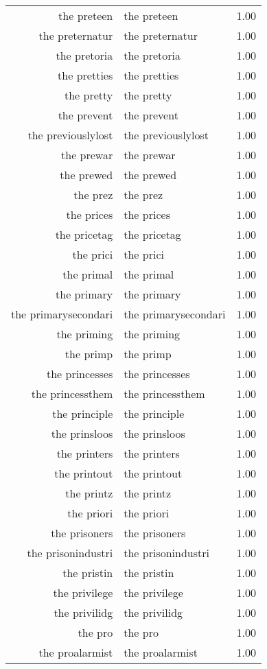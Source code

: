 \begin{table}[ht]
\begin{tabular}{rlr}
  the preteen & the preteen & 1.00 \\ 
  the preternatur & the preternatur & 1.00 \\ 
  the pretoria & the pretoria & 1.00 \\ 
  the pretties & the pretties & 1.00 \\ 
  the pretty & the pretty & 1.00 \\ 
  the prevent & the prevent & 1.00 \\ 
  the previouslylost & the previouslylost & 1.00 \\ 
  the prewar & the prewar & 1.00 \\ 
  the prewed & the prewed & 1.00 \\ 
  the prez & the prez & 1.00 \\ 
  the prices & the prices & 1.00 \\ 
  the pricetag & the pricetag & 1.00 \\ 
  the prici & the prici & 1.00 \\ 
  the primal & the primal & 1.00 \\ 
  the primary & the primary & 1.00 \\ 
  the primarysecondari & the primarysecondari & 1.00 \\ 
  the priming & the priming & 1.00 \\ 
  the primp & the primp & 1.00 \\ 
  the princesses & the princesses & 1.00 \\ 
  the princessthem & the princessthem & 1.00 \\ 
  the principle & the principle & 1.00 \\ 
  the prinsloos & the prinsloos & 1.00 \\ 
  the printers & the printers & 1.00 \\ 
  the printout & the printout & 1.00 \\ 
  the printz & the printz & 1.00 \\ 
  the priori & the priori & 1.00 \\ 
  the prisoners & the prisoners & 1.00 \\ 
  the prisonindustri & the prisonindustri & 1.00 \\ 
  the pristin & the pristin & 1.00 \\ 
  the privilege & the privilege & 1.00 \\ 
  the privilidg & the privilidg & 1.00 \\ 
  the pro & the pro & 1.00 \\ 
  the proalarmist & the proalarmist & 1.00 \\ 

\end{tabular}
\end{table}
